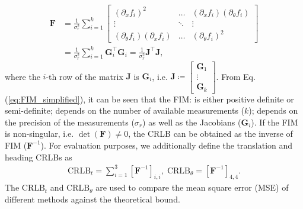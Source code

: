 \documentclass[journal]{IEEEtran}
\def\FIM{\mathbf{F}}
\def\detF{\det(\FIM)}
\begin{document}
\begin{equation}\label{eq:FIM_simplified}
\begin{aligned}
    \FIM 
    &= \frac{1}{\sigma_r^2}
    \sum\limits_{i=1}^{k}
    \begin{bmatrix}
        (\partial_x f_i)^2 & \dots & (\partial_x f_i)(\partial_{\theta} f_i) \\
        \vdots & \ddots & \vdots \\
        (\partial_{\theta} f_i)(\partial_x f_i) & \dots & (\partial_{\theta} f_i)^2
    \end{bmatrix} \\
    &= \frac{1}{\sigma_r^2} \sum\limits_{i=1}^{k} \mathbf{G}_i^\top \mathbf{G}_i 
    = \frac{1}{\sigma_r^2} \mathbf{J}^\top \mathbf{J},
\end{aligned}
\end{equation}
where the $i$-th row of the matrix $\mathbf{J}$ is $\mathbf{G}_i$, i.e. 
$\mathbf{J} \coloneqq 
    \begin{bmatrix}
        \mathbf{G}_1\\
        \vdots\\
        \mathbf{G}_k
    \end{bmatrix}$.
From Eq. (\ref{eq:FIM_simplified}), it can be seen that the FIM: is either positive definite or semi-definite; depends on the number of available measurements ($k$); depends on the precision of the measurements ($\sigma_r$) as well as the Jacobians ($\mathbf{G}_i$). 
If the FIM is non-singular, i.e. $\detF \neq 0$, the CRLB can be obtained as the inverse of FIM ($\FIM^{-1}$).
For evaluation purposes, we additionally define the translation and heading CRLBs as
\begin{equation}
\begin{aligned}
    \textrm{CRLB}_t = \sum\limits_{i=1}^{3}  [\FIM^{-1}]_{i,i},\;\textrm{CRLB}_{\theta} = [\FIM^{-1}]_{4,4}.
\end{aligned}
\end{equation}
The $\textrm{CRLB}_t$ and $\textrm{CRLB}_{\theta}$ are used to compare the mean square error (MSE) of different methods against the theoretical bound.
\end{document}
